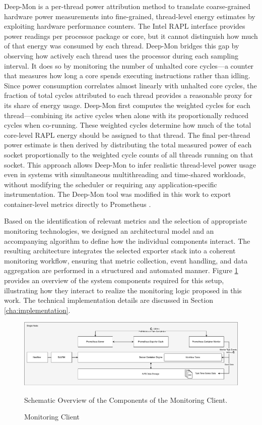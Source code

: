 Deep-Mon is a per-thread power attribution method to translate coarse-grained hardware power measurements into fine-grained, thread-level energy estimates by exploiting hardware performance counters. The Intel RAPL interface provides power readings per processor package or core, but it cannot distinguish how much of that energy was consumed by each thread. Deep-Mon bridges this gap by observing how actively each thread uses the processor during each sampling interval. It does so by monitoring the number of unhalted core cycles—a counter that measures how long a core spends executing instructions rather than idling. Since power consumption correlates almost linearly with unhalted core cycles, the fraction of total cycles attributed to each thread provides a reasonable proxy for its share of energy usage. Deep-Mon first computes the weighted cycles for each thread—combining its active cycles when alone with its proportionally reduced cycles when co-running. These weighted cycles determine how much of the total core-level RAPL energy should be assigned to that thread. The final per-thread power estimate is then derived by distributing the total measured power of each socket proportionally to the weighted cycle counts of all threads running on that socket. This approach allows Deep-Mon to infer realistic thread-level power usage even in systems with simultaneous multithreading and time-shared workloads, without modifying the scheduler or requiring any application-specific instrumentation. The Deep-Mon tool was modified in this work to export container-level metrics directly to Prometheus \cite{8425477}.

Based on the identification of relevant metrics and the selection of appropriate monitoring technologies, we designed an architectural model and an accompanying algorithm to define how the individual components interact. The resulting architecture integrates the selected exporter stack into a coherent monitoring workflow, ensuring that metric collection, event handling, and data aggregation are performed in a structured and automated manner. Figure \ref{fig:04-monitoring} provides an overview of the system components required for this setup, illustrating how they interact to realize the monitoring logic proposed in this work. The technical implementation details are discussed in Section \ref{cha:implementation}.

\begin{figure}[H]
    \centering
    \includegraphics[scale=0.45]{fig/04/04-monitoring.pdf}
    \small
    \caption{Monitoring Client}
    \label{fig:04-monitoring}
    \tiny
    Schematic Overview of the Components of the Monitoring Client.
\end{figure}

